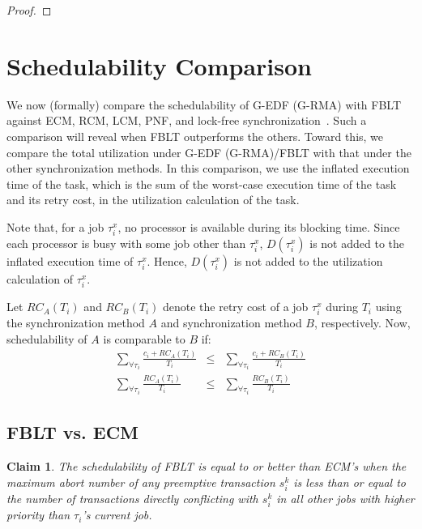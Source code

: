 \documentclass[prodmode,acmtecs]{acmsmall}
\newtheorem{clm}{Claim}
\begin{document}
\begin{compactenum}
\begin{proof}
\end{proof}


\section{Schedulability Comparison}\label{schedulabiltiy comparison}

We now (formally) compare the schedulability of G-EDF (G-RMA) with FBLT against ECM, RCM, LCM, PNF, and lock-free synchronization~\cite{stmconcurrencycontrol:emsoft11,lcmdac2012,key-5,shambake_phd_proposal}. 
Such a comparison will reveal when FBLT outperforms the others. Toward this, we compare the total utilization under G-EDF (G-RMA)/FBLT with that under the other synchronization methods. In this comparison, we use the inflated execution time of the task, which is the sum of the worst-case execution time of the task and its retry cost, in the utilization calculation of the task.

Note that, for a job $\tau_i^x$, no processor is available during its blocking time. Since each processor is busy with some job other than $\tau_i^x$, $D(\tau_i^x)$ is not added to the inflated execution time of $\tau_i^x$. Hence, $D(\tau_i^x)$ is not added to the utilization calculation of $\tau_i^x$.

Let $RC_{A}(T_{i})$ and $RC_{B}(T_{i})$ denote the retry cost of a job $\tau_{i}^{x}$ during $T_{i}$ using the synchronization method $A$ and synchronization
method $B$, respectively. Now, schedulability of $A$ is comparable to $B$ if:
\begin{eqnarray}
\sum_{\forall\tau_{i}}\frac{c_{i}+RC_{A}(T_{i})}{T_{i}} & \le & \sum_{\forall\tau_{i}}\frac{c_{i}+RC_{B}(T_{i})}{T_{i}}\nonumber \\
\sum_{\forall\tau_{i}}\frac{RC_{A}(T_{i})}{T_{i}} & \le & \sum_{\forall\tau_{i}}\frac{RC_{B}(T_{i})}{T_{i}}\label{eq:utilization comparison}
\end{eqnarray}


\subsection{FBLT vs. ECM}

\begin{clm}\label{clm:fblt_ecm}
The schedulability of FBLT is equal to or better than ECM's when the maximum abort number of any preemptive transaction $s_i^k$ is less than or equal to the number of transactions directly conflicting with $s_i^k$ in all other jobs with higher priority than $\tau_{i}$'s current job. 
\end{clm}


\end{compactenum}
\end{document}
